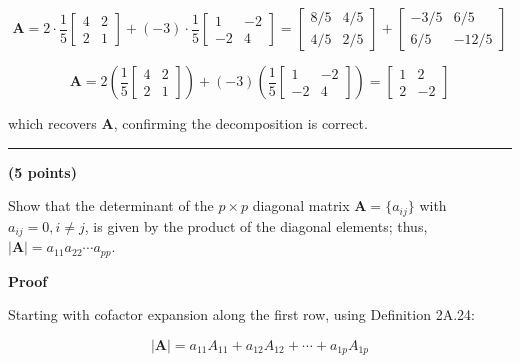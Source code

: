 \documentclass[12pt]{article}
\begin{document}
$$
\mathbf{A} = 2\cdot\frac{1}{5}\begin{bmatrix} 4 & 2 \\ 2 & 1 \end{bmatrix} + (-3)\cdot\frac{1}{5}\begin{bmatrix} 1 & -2 \\ -2 & 4 \end{bmatrix}
=
\begin{bmatrix} 8/5 & 4/5 \\ 4/5 & 2/5 \end{bmatrix}
+
\begin{bmatrix} -3/5 & 6/5 \\ 6/5 & -12/5 \end{bmatrix}
$$

$$
\boxed{
\mathbf{A} = 2\left(\frac{1}{5}\begin{bmatrix} 4 & 2 \\ 2 & 1 \end{bmatrix}\right) + (-3)\left(\frac{1}{5}\begin{bmatrix} 1 & -2 \\ -2 & 4 \end{bmatrix}\right)
=
\begin{bmatrix} 1 & 2 \\ 2 & -2 \end{bmatrix}
}
$$

\noindent which recovers $\mathbf{A}$, confirming the decomposition is correct.

\vspace{2em}

\noindent\rule{\textwidth}{0.4pt}

\vspace{2em}

 \hfill {\large \textbf{(5 points)}}

\vspace{1em}

\noindent Show that the determinant of the $p \times p$ diagonal matrix $\mathbf{A} = \{a_{ij}\}$ with $a_{ij} = 0, i \neq j$, is given by the product of the diagonal elements; thus, $|\mathbf{A}| = a_{11}a_{22}\cdots a_{pp}$.

\vspace{1em}

\noindent \textbf{Proof}

\noindent Starting with cofactor expansion along the first row, using Definition 2A.24:

$$
|\mathbf{A}| = a_{11}A_{11} + a_{12}A_{12} + \cdots + a_{1p}A_{1p}
$$
\end{document}
